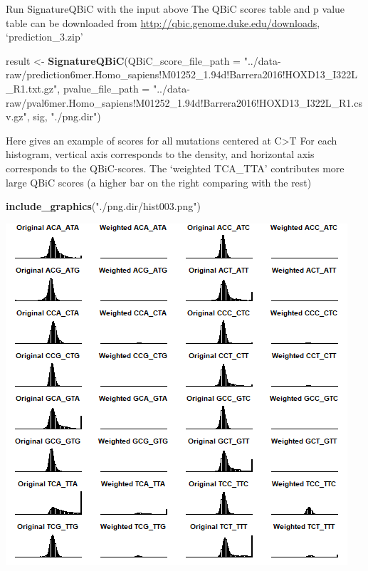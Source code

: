 \documentclass[
]{article}
\newenvironment{Shaded}{\begin{snugshade}}{\end{snugshade}}
\newcommand{\DataTypeTok}[1]{\textcolor[rgb]{0.13,0.29,0.53}{#1}}
\newcommand{\KeywordTok}[1]{\textcolor[rgb]{0.13,0.29,0.53}{\textbf{#1}}}
\newcommand{\NormalTok}[1]{#1}
\newcommand{\StringTok}[1]{\textcolor[rgb]{0.31,0.60,0.02}{#1}}
\begin{document}
Run SignatureQBiC with the input above The QBiC scores table and p value
table can be downloaded from
\url{http://qbic.genome.duke.edu/downloads}, `prediction\_3.zip'

\begin{Shaded}
\begin{Highlighting}[]
\NormalTok{result <-}\StringTok{ }
\StringTok{  }\KeywordTok{SignatureQBiC}\NormalTok{(}\DataTypeTok{QBiC_score_file_path =}
                  \StringTok{"../data-raw/prediction6mer.Homo_sapiens!M01252_1.94d!Barrera2016!HOXD13_I322L_R1.txt.gz"}\NormalTok{,}
                \DataTypeTok{pvalue_file_path =} 
                  \StringTok{"../data-raw/pval6mer.Homo_sapiens!M01252_1.94d!Barrera2016!HOXD13_I322L_R1.csv.gz"}\NormalTok{,}
\NormalTok{                sig, }
                \StringTok{"./png.dir"}\NormalTok{) }
\end{Highlighting}
\end{Shaded}

Here gives an example of scores for all mutations centered at
C\textgreater{}T For each histogram, vertical axis corresponds to the
density, and horizontal axis corresponds to the QBiC-scores. The
`weighted TCA\_TTA' contributes more large QBiC scores (a higher bar on
the right comparing with the rest)

\begin{Shaded}
\begin{Highlighting}[]
\KeywordTok{include_graphics}\NormalTok{(}\StringTok{"./png.dir/hist003.png"}\NormalTok{)}
\end{Highlighting}
\end{Shaded}

\includegraphics{./png.dir/hist003.png}
\end{document}
